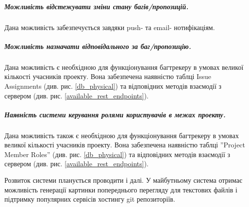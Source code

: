 \documentclass[../main.tex]{subfiles}
\begin{document}
\subparagraph{Можливість відстежувати зміни стану багів/пропозицій.}
Дана можливість забезпечується завдяки push- та email- нотифікаціям.

\subparagraph{Можливість назначати відповідального за баг/пропозицію.}
Дана можливість є необхідною для функціонування багтрекеру в умовах великої кількості учасників проекту. Вона забезпечена наявністю таблці Issue Assignments (див. рис. \ref{db_physical}) та відповідних методів взаємодії з сервером (див. рис. \ref{available_rest_endpoints}).

\subparagraph{Наявність системи керування ролями користувачів в межах проекту.}
Дана можливість також є необхідною для функціонування багтрекеру в умовах великої кількості учасників проекту. Вона забезпечена наявністю таблці ''Project Member Roles'' (див. рис. \ref{db_physical}) та відповідних методів взаємодії з сервером (див. рис. \ref{available_rest_endpoints}).

Розвиток системи планується проводити і далі. У майбутньому система отримає можливість генерації картинки попереднього перегляду для текстових файлів і підтримку популярних сервісів хостингу git репозиторіїв.

\end{document}
